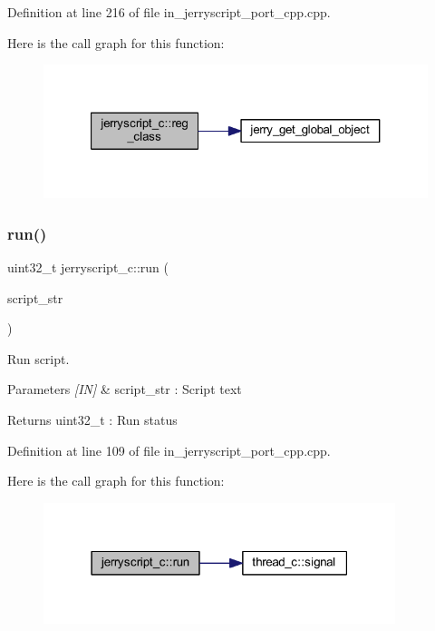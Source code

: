 Definition at line 216 of file in\+\_\+jerryscript\+\_\+port\+\_\+cpp.\+cpp.

Here is the call graph for this function\+:
\nopagebreak
\begin{figure}[H]
\begin{center}
\leavevmode
\includegraphics[width=321pt]{group___port_gaae2c344f9e86922fdd5b241f0a836e66_cgraph}
\end{center}
\end{figure}
\mbox{\label{group___port_gac83b22fbeb4d9d19f6d99c50f4abea51}} 
\subsubsection{run()}
{\footnotesize\ttfamily uint32\+\_\+t jerryscript\+\_\+c\+::run (\begin{DoxyParamCaption}\item[{wx\+String}]{script\+\_\+str }\end{DoxyParamCaption})}



Run script. 


\begin{DoxyParams}{Parameters}
{\em \mbox{[}\+I\+N\mbox{]}} & script\+\_\+str \+: Script text \\
\hline
\end{DoxyParams}
\begin{DoxyReturn}{Returns}
uint32\+\_\+t \+: Run status 
\end{DoxyReturn}


Definition at line 109 of file in\+\_\+jerryscript\+\_\+port\+\_\+cpp.\+cpp.

Here is the call graph for this function\+:
\nopagebreak
\begin{figure}[H]
\begin{center}
\leavevmode
\includegraphics[width=291pt]{group___port_gac83b22fbeb4d9d19f6d99c50f4abea51_cgraph}
\end{center}
\end{figure}
\mbox{\label{group___port_gaca34fa1641ebe3ec63372dc6355f913c}} 
